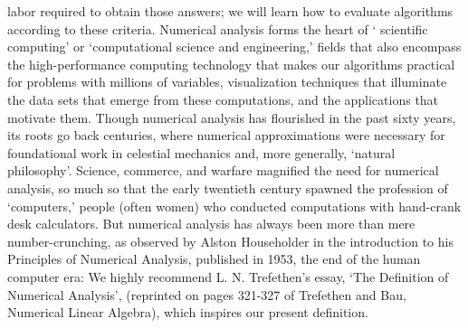 labor required to obtain those answers; we will learn how to evaluate algorithms according to these criteria. Numerical analysis forms the heart of `
scientific computing' or `computational science and engineering,' fields that also encompass the high-performance computing technology that makes our
algorithms practical for problems with millions of variables, visualization techniques that illuminate the data sets that emerge from these computations,
and the applications that motivate them. Though numerical analysis has flourished in the past sixty years, its roots go back centuries, where numerical approximations were necessary for foundational work in celestial mechanics and, more generally, `natural philosophy'. Science, commerce, and warfare
magnified the need for numerical analysis, so much so that the early twentieth century spawned the profession of `computers,' people (often women) who
conducted computations with hand-crank desk calculators. But numerical analysis has always been more than mere number-crunching, as observed by Alston Householder in the introduction to his Principles of Numerical Analysis, published in 1953, the end of the human computer era: We highly recommend L. N. Trefethen's essay, `The Definition of Numerical Analysis', (reprinted on pages 321-327 of Trefethen and Bau, Numerical Linear Algebra), which inspires our present definition.\


